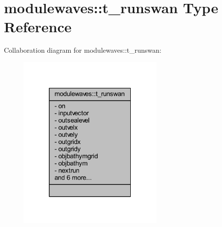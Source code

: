 \hypertarget{structmodulewaves_1_1t__runswan}{}\section{modulewaves\+:\+:t\+\_\+runswan Type Reference}
\label{structmodulewaves_1_1t__runswan}


Collaboration diagram for modulewaves\+:\+:t\+\_\+runswan\+:\nopagebreak
\begin{figure}[H]
\begin{center}
\leavevmode
\includegraphics[width=205pt]{structmodulewaves_1_1t__runswan__coll__graph}
\end{center}
\end{figure}
